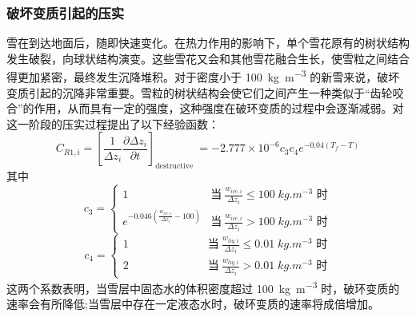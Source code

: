 \subsubsection{破坏变质引起的压实}
雪在到达地面后，随即快速变化。在热力作用的影响下，单个雪花原有的树状结构发生破裂，向球状结构演变。这些雪花又会和其他雪花融合生长，使雪粒之间结合得更加紧密，最终发生沉降堆积。对于密度小于 \qty{100}{kg.m^{-3}} 的新雪来说，破坏变质引起的沉降非常重要。雪粒的树状结构会使它们之间产生一种类似于“齿轮咬合”的作用，从而具有一定的强度，这种强度在破环变质的过程中会逐渐减弱。\citet{anderson1976point}对这一阶段的压实过程提出了以下经验函数：
\begin{equation}\label{eq:DestruciveCompact}
C_{R1,i}=\left[\frac{1}{\Delta {z_i}} \frac{\partial \Delta {z_i}}{\partial {t}}\right]_{\text {destructive }}=-2.777 \times 10^{-6} {c}_{3} {c}_{4} {e}^{-0.04\left(T_f-T\right)}
\end{equation}
其中
\begin{equation}
    c_3=\begin{cases}
        1 &\text{当}\ \frac{w_{ice,i}}{\Delta z_i} \leqslant 100 \;\unit{kg.m^{-3}}\text{ 时} \\
        e^{-0.046\left(\frac{w_{ice,i}}{\Delta z_i}-100\right)} &\text{当}\ \frac{w_{ice,i}}{\Delta z_i}>100 \;\unit{kg.m^{-3}}\text{ 时}
    \end{cases}
\end{equation}
\begin{equation}
    c_4=\begin{cases}
        1 &\qquad \quad \qquad \quad \;\text{当}\ \frac{w_{liq,i}}{\Delta z_i} \leqslant 0.01 \;\unit{kg.m^{-3}}\text{ 时} \\
        2 &\qquad \quad \qquad \quad \;\text{当}\ \frac{w_{liq,i}}{\Delta z_i}>0.01 \;\unit{kg.m^{-3}}\text{ 时}
    \end{cases}
\end{equation}
这两个系数表明，当雪层中固态水的体积密度超过 \qty{100}{kg.m^{-3}} 时，破环变质的速率会有所降低;当雪层中存在一定液态水时，破环变质的速率将成倍增加。

